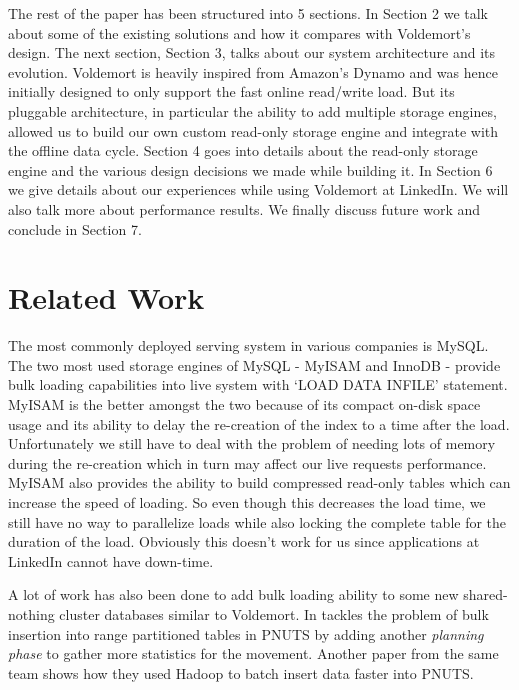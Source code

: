 \documentclass[10pt,twocolumn,preprint,natbib,authoryear]{sigplanconf}
\begin{document}
The rest of the paper has been structured into 5 sections. In Section 2 we talk about some of the existing solutions and how it compares with Voldemort's design. The next section, Section 3,  talks about our system architecture and its evolution. Voldemort is heavily inspired from Amazon's Dynamo\cite{5} and was hence initially designed to only support the fast online read/write load. But its pluggable architecture, in particular the ability to add multiple storage engines, allowed us to build our own custom read-only storage engine and integrate with the offline data cycle. Section 4 goes into details about the read-only storage engine and the various design decisions we made while building it. In Section 6 we give details about our experiences while using Voldemort at LinkedIn. We will also talk more about performance results. We finally discuss future work and conclude in Section 7. 


\section{Related Work}
The most commonly deployed serving system in various companies is MySQL. The two most used storage engines of MySQL - MyISAM and InnoDB - provide bulk loading capabilities into live system with `LOAD DATA INFILE' statement. MyISAM is the better amongst the two because of its compact on-disk space usage and its ability to delay the re-creation of the index to a time after the load\cite{6 - http://dev.mysql.com/doc/refman/5.5/en/optimizing-myisam-bulk-data-loading.html}.  Unfortunately we still have to deal with the problem of needing lots of memory during the re-creation which in turn may affect our live requests performance. MyISAM also provides the ability to build compressed read-only tables \cite{7 - http://dev.mysql.com/doc/refman/5.5/en/myisampack.html} which can increase the speed of loading. So even though this decreases the load time, we still have no way to parallelize loads while also locking the complete table for the duration of the load. Obviously this doesn't work for us since applications at LinkedIn cannot have down-time. 

A lot of work has also been done to add bulk loading ability to some new shared-nothing cluster\cite{The Case for Shared Nothing Database} databases similar to Voldemort. In \cite{8 - Efﬁcient Bulk Insertion into a Distributed Ordered Table} tackles the problem of bulk insertion into range partitioned tables in PNUTS \cite{9 - PNUTS paper} by adding another \emph {planning phase} to gather more statistics for the movement. Another paper from the same team \cite{A Batch of PNUTS: Experiences Connecting Cloud Batch and Serving Systems} shows how they used Hadoop to batch insert data faster into PNUTS.
\end{document}
